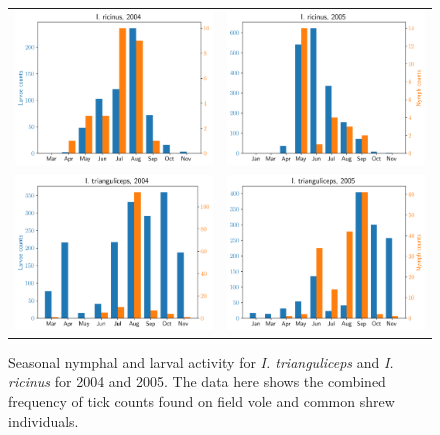 \documentclass[hidelinks]{article}
\begin{document}
\begin{figure}[]
	\begin{mdframed}[backgroundcolor=grey250,rightline=false,leftline=false,topline=false]
	\centering
	\begin{tabular}{ll}
		\includegraphics[width=.495\linewidth,valign=m]{I. ricinus, 2004} & \includegraphics[width=.5\linewidth,valign=m]{I. ricinus, 2005} \\
		\includegraphics[width=.495\linewidth,valign=m]{I. trianguliceps, 2004} & \includegraphics[width=.5\linewidth,valign=m]{I. trianguliceps, 2005} \\
	\end{tabular}
	\caption{ Seasonal nymphal and larval activity for \textit{I. trianguliceps} and \textit{I. ricinus} for 2004 and 2005. The data here shows the combined frequency of tick counts found on field vole and common shrew individuals.}
	\label{fig:kielder_seasonal}
	\end{mdframed}
\end{figure}
\end{document}
